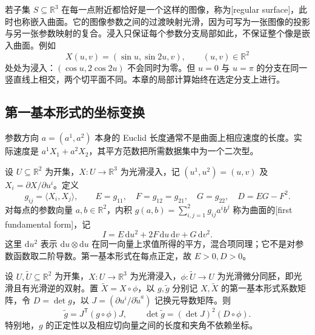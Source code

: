 若子集 \(S\subseteq\mathbb R^3\) 在每一点附近都恰好是一个这样的图像，称为[regular surface]，此时也称嵌入曲面。它的图像参数之间的过渡映射光滑，因为可写为一张图像的投影与另一张参数映射的复合。浸入只保证每个参数分支局部如此，不保证整个像是嵌入曲面。例如
\[
	X(u,v)=(\sin u,\sin2u,v),\qquad (u,v)\in\mathbb R^2
\]
处处为浸入：\((\cos u,2\cos2u)\) 不会同时为零。但 \(u=0\) 与 \(u=\pi\) 的分支在同一竖直线上相交，两个切平面不同。本章的局部计算始终在选定分支上进行。

\subsection{第一基本形式的坐标变换}
\label{g1:subsec:0801:02}

参数方向 \(a=(a^1,a^2)\) 本身的 Euclid 长度通常不是曲面上相应速度的长度。实际速度是 \(a^1X_1+a^2X_2\)，其平方范数把所需数据集中为一个二次型。

\begin{definition}[第一基本形式]\label{g1:def:first-fundamental-form}
	设 \(U\subseteq\mathbb R^2\) 为开集，\(X:U\rightarrow\mathbb R^3\) 为光滑浸入，记 \((u^1,u^2)=(u,v)\) 及 \(X_i=\partial X/\partial u^i\)。定义
	\[
		g_{ij}=\langle X_i,X_j\rangle,\qquad
		E=g_{11},\quad F=g_{12}=g_{21},\quad G=g_{22},\quad D=EG-F^2.
	\]
	对每点的参数向量 \(a,b\in\mathbb R^2\)，内积 \(g(a,b)=\sum_{i,j=1}^2g_{ij}a^ib^j\) 称为曲面的[first fundamental form]，记
	\[
		I=E\,\mathrm{d}u^2+2F\,\mathrm{d}u\,\mathrm{d}v+G\,\mathrm{d}v^2.
	\]
	这里 \(\mathrm{d}u^2\) 表示 \(\mathrm{d}u\otimes \mathrm{d}u\) 在同一向量上求值所得的平方，混合项同理；它不是对参数函数取二阶导数。第一基本形式在每点正定，故 \(E>0,D>0\)。
\end{definition}

\begin{proposition}\label{g1:prop:surface-metric-change}
	设 \(U,\widetilde U\subseteq\mathbb R^2\) 为开集，\(X:U\rightarrow\mathbb R^3\) 为光滑浸入，\(\phi:\widetilde U\rightarrow U\) 为光滑微分同胚，即光滑且有光滑逆的双射。置 \(\widetilde X=X\circ\phi\)，以 \(g,\widetilde g\) 分别记 \(X,\widetilde X\) 的第一基本形式系数矩阵，令 \(D=\det g\)，以 \(J=(\partial u^i/\partial\widetilde u^a)\) 记换元导数矩阵。则
	\begin{equation}\label{g1:eq:surface-metric-change}
		\widetilde g=J^{\mathsf T}(g\circ\phi)J,\qquad
		\det\widetilde g=(\det J)^2(D\circ\phi).
	\end{equation}
	特别地，\(g\) 的正定性以及相应切向量之间的长度和夹角不依赖坐标。
\end{proposition}

